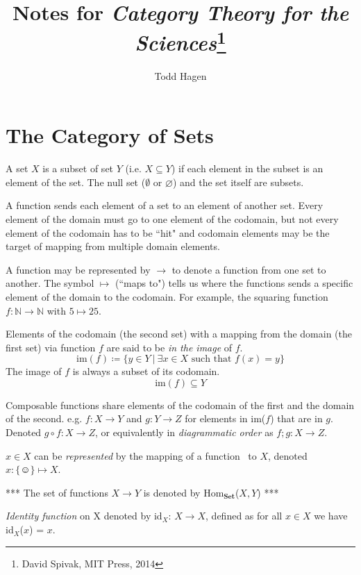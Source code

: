 \documentclass{article}
\author{Todd Hagen}
\title{Notes for \emph{Category Theory for the Sciences}\footnote{David Spivak, MIT Press, 2014}}
\date{}
\begin{document}
\maketitle
\section{The Category of Sets}
A set $X$ is a subset of set $Y$ (i.e. $X \subseteq Y$) if each element in the subset is an element of the set. The null set ($\emptyset$ or $\varnothing$) and the set itself are subsets. 

A function sends each element of a set to an element of another set. Every element of the domain must go to one element of the codomain, but not every element of the codomain has to be ``hit" and codomain elements may be the target of mapping from multiple domain elements. 

A function may be represented by $\rightarrow$ to denote a function from one set to another. The symbol $\mapsto$ (``maps to") tells us where the functions sends a specific element of the domain to the codomain. For example, the squaring function $f: \mathbb{N} \rightarrow \mathbb{N}$ with $5 \mapsto 25$. 

Elements of the codomain (the second set) with a mapping from the domain (the first set) via function $f$  are said to be \textit{in the image} of $f$. 
\begin{equation*}
\text{im}(f) \coloneqq \{y \in Y\ |\ \exists x \in X \text{ such that } f(x) = y\}
\end{equation*} 
The image of $f$ is always a subset of its codomain.
\begin{equation*}
\text{im}(f) \subseteq Y
\end{equation*}

Composable functions share elements of the codomain of the first and the domain of the second. e.g. $f: X \rightarrow Y$ and $g: Y \rightarrow Z$ for elements in im($f$) that are in $g$. Denoted $g \circ f: X \rightarrow Z$, or equivalently in \textit{diagrammatic order} as $f;g: X \rightarrow Z$.

$x \in X$ can be \textit{represented} by the mapping of a function \smiley\ to $X$, denoted $x: \{ \smiley \} \mapsto X$. 

*** The set of functions $X \rightarrow Y$ is denoted by Hom$_{\textbf{Set}}$($X,Y$) ***

\textit{Identity function} on X denoted by id$_{X}$: $X \rightarrow X$, defined as for all $x \in X$ we have id$_{X}$($x$) = $x$.
\end{document}
